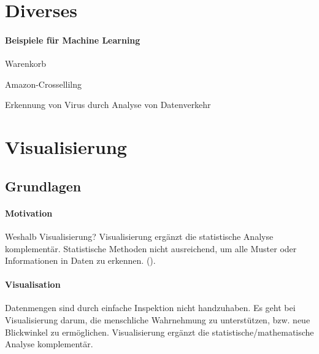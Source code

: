 \documentclass[10pt]{article} %
\begin{document}
 
\pagebreak

\section{Diverses}



\paragraph{Beispiele für Machine Learning} 
\begin{cptitemize} 
      \item Warenkorb
      \item Amazon-Crossellilng
      \item Erkennung von Virus durch Analyse von Datenverkehr 
\end{cptitemize} 


\pagebreak


\pagebreak

\section{Visualisierung}
\localtableofcontents

\subsection{Grundlagen}

\paragraph{Motivation} Weshalb Visualisierung?
Visualisierung ergänzt die statistische Analyse komplementär. Statistische Methoden nicht ausreichend, um alle Muster oder Informationen in Daten zu erkennen. (). 

\paragraph{Visualisation} Datenmengen sind durch einfache Inspektion nicht handzuhaben. Es geht bei Visualisierung darum, die menschliche Wahrnehmung zu unterstützen, bzw. neue Blickwinkel zu ermöglichen. Visualisierung ergänzt die statistische/mathematische Analyse komplementär. 
\end{document}
